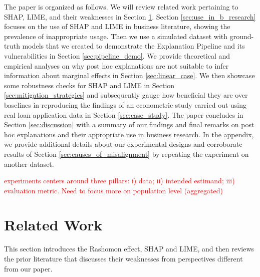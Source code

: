 \documentclass[mnsc,blindrev]{informs3}
\newcommand{\tw}[1]{\textcolor{red}{Tong: #1}}
\begin{document}
    The paper is organized as follows. We will review related work pertaining to SHAP, LIME, and their weaknesses in Section \ref{sec:related_work}. Section \ref{sec:use_in_b_research} focuses on the use of SHAP and LIME in business literature, showing the prevalence of inappropriate usage. Then we use a simulated dataset with ground-truth models that we created to demonstrate the Explanation Pipeline and its vulnerabilities in Section \ref{sec:pipeline_demo}.  We provide theoretical and empirical analyses on why post hoc explanations are not suitable to infer information about marginal effects in Section \ref{sec:linear_case}. 
    We then showcase some robustness checks for SHAP and LIME in Section \ref{sec:mitigation_strategies} and subsequently gauge how beneficial they are over baselines in reproducing the findings of an econometric study carried out using real loan application data in Section \ref{sec:case_study}. The paper concludes in Section \ref{sec:discussion} with a summary of our findings and final remarks on post hoc explanations and their appropriate use in business research. In the appendix, we provide additional details about our experimental designs and  corroborate results of Section \ref{sec:causes_of_misalignment} by repeating the experiment on another dataset.%

    \textcolor{red}{experiments centers around three pillars: i) data; ii) intended estimand; iii) evaluation metric. Need to focus more on population level (aggregated)}
\section{Related Work}
    \label{sec:related_work}
    This section introduces the Rashomon effect, SHAP and LIME, and then reviews the prior literature that discusses their weaknesses from perspectives different from our paper. %

    
\end{document}
